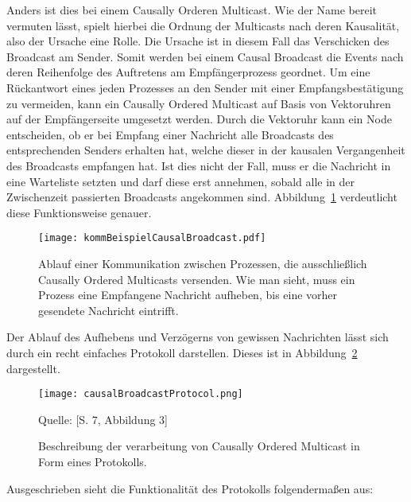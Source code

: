 Anders ist dies bei einem Causally Orderen Multicast. Wie der Name bereit vermuten lässt, spielt hierbei die Ordnung der Multicasts nach deren Kausalität, also der Ursache eine Rolle. Die Ursache ist in diesem Fall das Verschicken des Broadcast am Sender. Somit werden bei einem Causal Broadcast die Events nach deren Reihenfolge des Auftretens am Empfängerprozess geordnet. Um eine Rückantwort eines jeden Prozesses an den Sender mit einer Empfangsbestätigung zu vermeiden, kann ein Causally Ordered Multicast auf Basis von Vektoruhren auf der Empfängerseite umgesetzt werden. Durch die Vektoruhr kann ein Node entscheiden, ob er bei Empfang einer Nachricht alle Broadcasts des entsprechenden Senders erhalten hat, welche dieser in der kausalen Vergangenheit des Broadcasts empfangen hat. Ist dies nicht der Fall, muss er die Nachricht in eine Warteliste setzten und darf diese erst annehmen, sobald alle in der Zwischenzeit passierten Broadcasts angekommen sind. Abbildung~\ref{figure:causalbroadcast} verdeutlicht diese Funktionsweise genauer.

\begin{figure}[ht]
	\centering
	\texttt{[image: kommBeispielCausalBroadcast.pdf]}
	\caption[Kommunikation durch Causally Ordered Multicasts]{Ablauf einer Kommunikation zwischen Prozessen, die ausschließlich Causally Ordered Multicasts versenden. Wie man sieht, muss ein Prozess eine Empfangene Nachricht aufheben, bis eine vorher gesendete Nachricht eintrifft.}
	\label{figure:causalbroadcast}
\end{figure}
\FloatBarrier

Der Ablauf des Aufhebens und Verzögerns von gewissen Nachrichten lässt sich durch ein recht einfaches Protokoll darstellen. Dieses ist in Abbildung~\ref{figure:causalBroadcastProtocol} dargestellt.

\begin{figure}[ht]
	\centering
	\texttt{[image: causalBroadcastProtocol.png]}
	\caption[Protokoll für den Causally Ordered Multicast]{Beschreibung der verarbeitung von Causally Ordered Multicast in Form eines Protokolls.}
	Quelle: \cite{Baldoni:2002:FDC:1435723.1437765}[S. 7, Abbildung 3]
	\label{figure:causalBroadcastProtocol}
\end{figure}
\FloatBarrier

Ausgeschrieben sieht die Funktionalität des Protokolls folgendermaßen aus:

